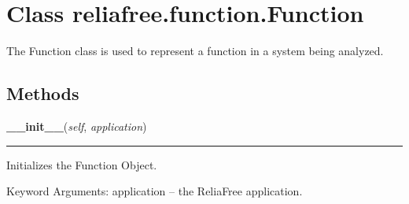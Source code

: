 %
%
%


\section{Class reliafree.function.Function}

    \label{reliafree:function:Function}
The Function class is used to represent a function in a system being 
analyzed.



  \subsection{Methods}

    \label{reliafree:function:Function:__init__}

    \vspace{0.5ex}

\hspace{.8\funcindent}\begin{boxedminipage}{\funcwidth}

    \raggedright \textbf{\_\_init\_\_}(\textit{self}, \textit{application})

    \vspace{-1.5ex}

    \rule{\textwidth}{0.5\fboxrule}
\setlength{\parskip}{2ex}
    Initializes the Function Object.

    Keyword Arguments: application -- the ReliaFree application.

\setlength{\parskip}{1ex}
    \end{boxedminipage}

